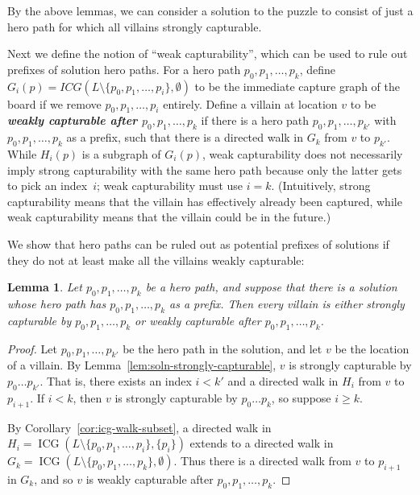 \documentclass[11pt,letterpaper]{article}
\def\defn#1{\textbf{\textit{\boldmath #1}}}
\newcommand{\ICG}{\operatorname{ICG}}
\theoremstyle{plain}
\newtheorem{lemma}[theorem]{Lemma}
\theoremstyle{definition}
\theoremstyle{remark}
\numberwithin{equation}{section}
\begin{document}
By the above lemmas, we can consider a solution to the puzzle to consist of
just a hero path for which all villains strongly capturable.

Next we define the notion of ``weak capturability'',
which can be used to rule out prefixes of solution hero paths.
%
For a hero path \(p_0, p_1, \ldots, p_k\),
define \(G_i(p) = ICG(L \setminus \{p_0, p_1, \ldots, p_i\}, \emptyset)\)
to be the immediate capture graph of the board if we remove
\(p_0, p_1, \ldots, p_i\) entirely.
%
Define a villain at location \(v\) to be
\defn{weakly capturable after \(p_0, p_1, \ldots, p_k\)} if
there is a hero path \(p_0, p_1, \ldots, p_{k'}\)
with \(p_0, p_1, \ldots, p_k\) as a prefix,
such that there is a directed walk in \(G_k\) from \(v\) to \(p_{k'}\).
While $H_i(p)$ is a subgraph of $G_i(p)$, weak capturability does not
necessarily imply strong capturability with the same hero path
because only the latter gets to pick an index~$i$;
weak capturability must use $i=k$.
(Intuitively, strong capturability means that the villain has effectively
already been captured, while weak capturability means that the villain
could be in the future.)

We show that hero paths can be ruled out as potential prefixes of
solutions if they do not at least make all the villains weakly capturable:

\begin{lemma}
  \label{lem:strong-or-weak}
  Let \(p_0, p_1, \dots, p_k\) be a hero path, and suppose that there is a
  solution whose hero path has \(p_0, p_1, \ldots, p_k\) as a prefix.
  Then every villain is either strongly capturable by \(p_0, p_1, \ldots, p_k\)
  or weakly capturable after \(p_0, p_1, \ldots, p_k\).
\end{lemma}
\begin{proof}
  Let \(p_0, p_1, \ldots, p_{k'}\) be the hero path in the solution,
  and let \(v\) be the location of a villain.
  By Lemma~\ref{lem:soln-strongly-capturable},
  \(v\) is strongly capturable by \(p_0 \ldots p_{k'}\).
  That is, there exists an index \(i < k'\) and a directed walk in \(H_i\)
  from \(v\) to \(p_{i+1}\).
  If \(i < k\), then \(v\) is strongly capturable by \(p_0 \ldots p_k\),
  so suppose \(i \ge k\).

  By Corollary~\ref{cor:icg-walk-subset}, a directed walk in
  \(H_i = \ICG(L \setminus \{p_0, p_1, \ldots, p_i\}, \{p_i\})\)
  extends to a directed walk in
  \(G_k = \ICG(L \setminus \{p_0, p_1, \ldots, p_k\}, \emptyset)\).
  Thus there is a directed walk from \(v\) to \(p_{i+1}\) in \(G_k\),
  and so \(v\) is weakly capturable after \(p_0, p_1, \ldots, p_k\).
\end{proof}
\end{document}
